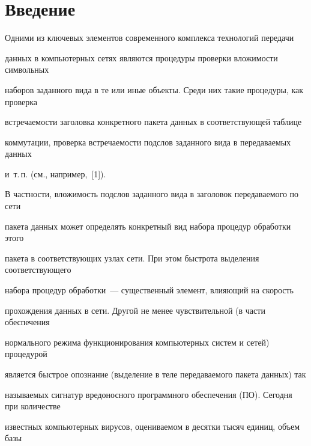 




      \thispagestyle{headings}



      

            \label{st\stat}

            

            \vspace*{-12pt}



\section{Введение}



     Одними из ключевых элементов современного комплекса технологий передачи 

данных в компьютерных сетях являются процедуры проверки вложимости символьных 

наборов заданного вида в те или иные объекты. Среди них такие процедуры, как проверка 

встречаемости заголовка конкретного пакета данных в соответствующей таблице 

коммутации, проверка встречаемости подслов заданного вида в передаваемых данных 

и~т.\,п. (см., например,~[1]). 

     

     В частности, вложимость подслов заданного вида в заголовок передаваемого по сети 

пакета данных может определять конкретный вид набора процедур обработки этого 

пакета в соответствующих узлах сети. При этом быстрота выделения соответствующего 

набора процедур обработки~--- существенный элемент, вли\-яющий на скорость 

прохождения данных в сети. Другой не менее чувствительной (в части обеспечения 

нормального режима функционирования компьютерных систем и сетей) процедурой 

является быстрое опознание (выделение в теле передаваемого пакета данных) так 

называемых сигнатур вредоносного программного обеспечения (ПО). Сегодня при количестве 

известных компьютерных вирусов, оцениваемом в десятки тысяч единиц, объем базы 

